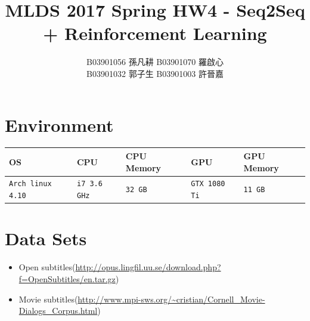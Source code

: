 \documentclass[12pt, a4paper]{article}
\title{MLDS 2017 Spring HW4 - Seq2Seq + Reinforcement Learning}
\author{B03901056 孫凡耕 B03901070 羅啟心\\
        B03901032 郭子生 B03901003 許晉嘉}
\date{\vspace{-5ex}}
\theoremstyle{mystyle}	%
\begin{document}
\maketitle 
{}%
\thispagestyle{empty}
\section{Environment}
  \begin{table}[h]
  \centering
    \begin{tabular}{|C{4cm}|C{2.5cm}|C{3cm}|C{2.5cm}|C{3cm}|}
      \hline
      OS & CPU & CPU Memory & GPU & GPU Memory \\
      \hline
      \texttt{Arch linux 4.10} &
      \texttt{i7 3.6 GHz} &
      \texttt{32 GB} &
      \texttt{GTX 1080 Ti}  &
      \texttt{11 GB}  \\
      \hline
    \end{tabular}
  \end{table}


\section{Data Sets}
\begin{itemize}
  \item Open subtitles(\href{http://opus.lingfil.uu.se/download.php?f=OpenSubtitles/en.tar.gz}{\url{http://opus.lingfil.uu.se/download.php?f=OpenSubtitles/en.tar.gz}})
  \item Movie subtitles(\href{http://www.mpi-sws.org/~cristian/Cornell_Movie-Dialogs_Corpus.html}{\url{http://www.mpi-sws.org/~cristian/Cornell_Movie-Dialogs_Corpus.html}})
\end{itemize}
\end{document}
